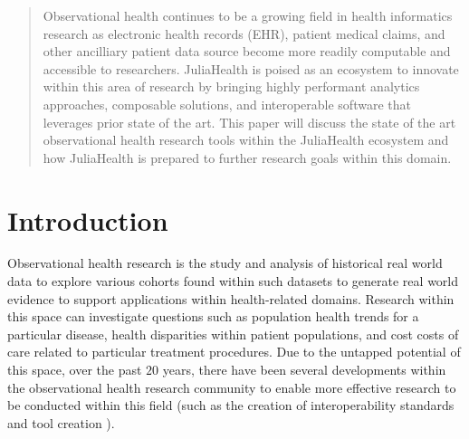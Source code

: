 \documentclass{juliacon}
\begin{document}


\maketitle

\begin{abstract}

Observational health continues to be a growing field in health informatics research as electronic health records (EHR), patient medical claims, and other ancilliary patient data source become more readily computable and accessible to researchers.
JuliaHealth is poised as an ecosystem to innovate within this area of research by bringing highly performant analytics approaches, composable solutions, and interoperable software that leverages prior state of the art. 
This paper will discuss the state of the art observational health research tools within the JuliaHealth ecosystem and how JuliaHealth is prepared to further research goals within this domain.

\end{abstract}

\section{Introduction}

Observational health research is the study and analysis of historical real world data to explore various cohorts found within such datasets to generate real world evidence to support applications within health-related domains.
Research within this space can investigate questions such as population health trends for a particular disease, health disparities within patient populations, and cost costs of care related to particular treatment procedures.
Due to the untapped potential of this space, over the past $20$ years, there have been several developments within the observational health research community to enable more effective research to be conducted within this field (such as the creation of interoperability standards and tool creation \cite{benderHL7FHIRAgile2013; mandelSMARTFHIRStandardsbased2016; overhage2012validation}).
\end{document}
